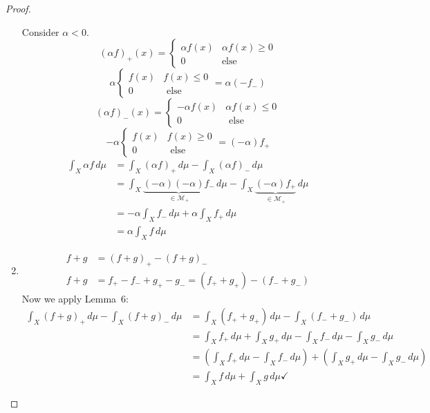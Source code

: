 \documentclass{article}
\begin{document}
\begin{proof}
\begin{enumerate}
      Consider $\alpha < 0$.
      \[
        (\alpha f)_+(x) = \begin{cases}
          \alpha f(x) & \alpha f(x) \geq 0 \\
          0 & \text{else}
        \end{cases}
      \] \[
        \alpha \begin{cases}
          f(x) & f(x) \leq 0 \\
          0 & \text{ else}
        \end{cases}
        = \alpha (-f_-)
      \] \[
        (\alpha f)_-(x) = \begin{cases}
          -\alpha f(x) & \alpha f(x) \leq 0 \\
          0 & \text{ else}
        \end{cases}
      \] \[
        -\alpha \begin{cases}
          f(x) & f(x) \geq 0 \\
          0 & \text{ else}
        \end{cases} = (-\alpha) f_+
      \]
      \begin{align*}
        \int_X \alpha f \, d\mu &= \int_X (\alpha f)_+ \, d\mu - \int_X (\alpha f)_- \, d\mu \\
          &= \int_X \underbrace{(-\alpha) (-\alpha) f_-}_{\in \mathcal M_+} \, d\mu - \int_X \underbrace{(-\alpha) f_+}_{\in \mathcal M_+} \, d\mu \\
          &= -\alpha \int_X f_- \, d\mu + \alpha \int_X f_+ \, d\mu \\
          &= \alpha \int_X f \, d\mu
      \end{align*}

    \item
      \begin{align*}
        f+g &= (f+g)_+ - (f+g)_- \\
        f+g &= f_+ - f_- + g_+ - g_- = (f_+ + g_+) - (f_- + g_-)
      \end{align*}
      Now we apply Lemma~6:
      \begin{align*}
        \int_X (f+g)_+ \, d\mu - \int_X (f + g)_- \, d\mu
          &= \int_X (f_+ + g_+) \, d\mu - \int_X (f_- + g_-) \, d\mu \\
          &= \int_X f_+ \, d\mu + \int_X g_+ \, d\mu - \int_X f_- \, d\mu - \int_X g_- \, d\mu \\
          &= \left(\int_X f_+ \, d\mu - \int_X f_- \, d\mu\right) + \left(\int_X g_+ \, d\mu - \int_X g_- \, d\mu\right) \\
          &= \int_X f\, d\mu + \int_X g \, d\mu \checkmark
      \end{align*}


\end{enumerate}
\end{proof}
\end{document}
